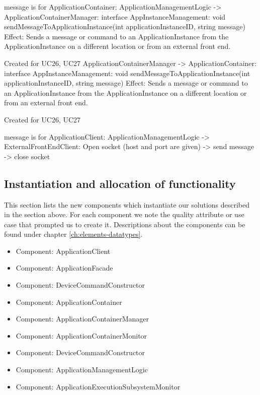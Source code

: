                 message is for ApplicationContainer:
                    ApplicationManagementLogic -> ApplicationContainerManager: interface AppInstanceManagement: void sendMessageToApplicationInstance(int applicationInstanceID, string message)
                        Effect: Sends a message or command to an ApplicationInstance from the ApplicationInstance on a different location or from an external front end.
                        \item Created for UC26, UC27
                    ApplicationContainerManager -> ApplicationContainer: interface AppInstanceManagement: void sendMessageToApplicationInstance(int applicationInstanceID, string message)
                        Effect: Sends a message or command to an ApplicationInstance from the ApplicationInstance on a different location or from an external front end.
                        \item Created for UC26, UC27

                message is for ApplicationClient:
                    ApplicationManagementLogic -> ExternalFrontEndClient: Open socket (host and port are given) -> send message -> close socket

\subsection{Instantiation and allocation of functionality}
    This section lists the new components which instantiate our solutions
    described in the section above. For each component we note the quality
    attribute or use case that prompted us to create it. Descriptions about
    the components can be found under chapter \ref{ch:elements-datatypes}. \\

    \begin{itemize}
        \item Component: ApplicationClient
        \item Component: ApplicationFacade
        \item Component: DeviceCommandConstructor
        \item Component: ApplicationContainer
        \item Component: ApplicationContainerManager
        \item Component: ApplicationContainerMonitor
        \item Component: DeviceCommandConstructor
        \item Component: ApplicationManagementLogic
        \item Component: ApplicationExecutionSubsystemMonitor
    \end{itemize}


